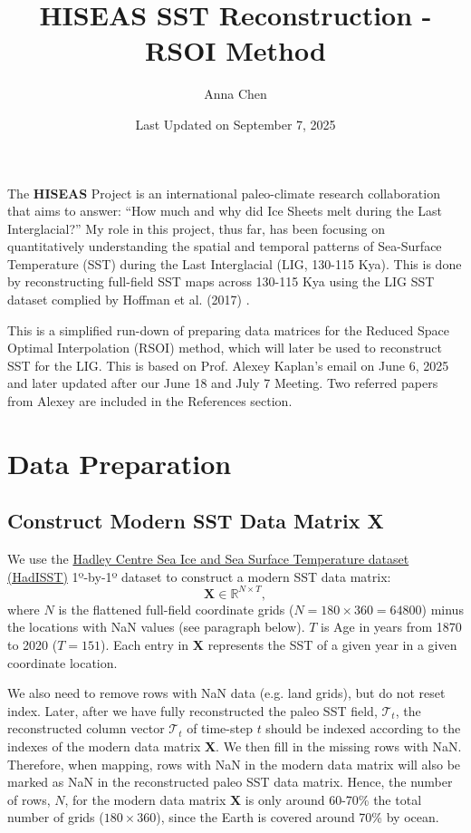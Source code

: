 \documentclass{article}
\title{HISEAS SST Reconstruction - RSOI Method}
\author{Anna Chen}
\date{Last Updated on September 7, 2025}
\begin{document}
\maketitle

The \textbf{HISEAS} Project is an international paleo-climate research collaboration that aims to answer: “How much and why did Ice Sheets melt during the Last Interglacial?” My role in this project, thus far, has been focusing on quantitatively understanding the spatial and temporal patterns of Sea-Surface Temperature (SST) during the Last Interglacial (LIG, 130-115 Kya). 
This is done by reconstructing full-field SST maps across 130-115 Kya using the LIG SST dataset complied by Hoffman et al. (2017) \cite{Hoffman2017}.

This is a simplified run-down of preparing data matrices for the Reduced Space Optimal Interpolation (RSOI) method, which will later be used to reconstruct SST for the LIG. This is based on Prof. Alexey Kaplan's email on June 6, 2025 and later updated after our June 18 and July 7 Meeting. Two referred papers from Alexey are included in the References section.

\section{Data Preparation}
\subsection{Construct Modern SST Data Matrix \textbf{X}}

We use the \ul{Hadley Centre Sea Ice and Sea Surface Temperature dataset (HadISST)} 1º-by-1º dataset \cite{HadISST} to construct a modern SST data matrix:
$$\textbf{X} \in \mathbb{R}^{N \times T},$$
where $N$ is the flattened full-field coordinate grids ($N = 180 \times 360 = 64800$) minus the locations with NaN values (see paragraph below).
$T$ is Age in years from 1870 to 2020 ($T=151$). Each entry in \textbf{X} represents the SST of a given year in a given coordinate location.

We also need to remove rows with NaN data (e.g. land grids), but do not reset index. Later, after we have fully reconstructed the paleo SST field, $\mathcal{T}_t$, the reconstructed column vector $\mathcal{T}_t$ of time-step $t$ should be indexed according to the indexes of the modern data matrix \textbf{X}. 
We then fill in the missing rows with NaN. Therefore, when mapping, rows with NaN in the modern data matrix will also be marked as NaN in the reconstructed paleo SST data matrix.
Hence, the number of rows, $N$, for the modern data matrix $\textbf{X}$ is only around 60-70\% the total number of grids ($180\times360$), since the Earth is covered around 70\% by ocean.
\end{document}
